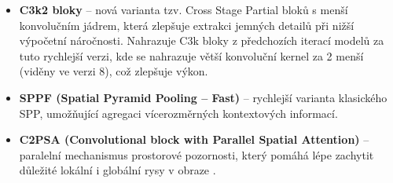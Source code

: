 \begin{itemize}
    \item \textbf{C3k2 bloky} -- nová varianta tzv. Cross Stage Partial bloků s menší konvolučním jádrem, která zlepšuje extrakci jemných detailů při nižší výpočetní náročnosti. Nahrazuje C3k bloky z předchozích iterací modelů za tuto rychlejší verzi, kde se nahrazuje větší konvoluční kernel za 2 menší (viděny ve verzi 8), což zlepšuje výkon.
    \item \textbf{SPPF (Spatial Pyramid Pooling – Fast)} -- rychlejší varianta klasického SPP, umožňující agregaci vícerozměrných kontextových informací.
    \item \textbf{C2PSA (Convolutional block with Parallel Spatial Attention)} -- paralelní mechanismus prostorové pozornosti, který pomáhá lépe zachytit důležité lokální i globální rysy v obraze \cite{yolov11}. 
\end{itemize}